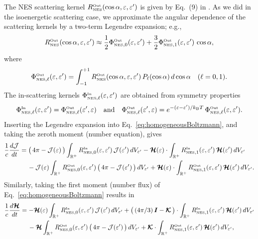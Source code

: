 \documentclass[10pt,preprint]{aastex}
\newcommand{\NES}{\mbox{\tiny NES}}
\begin{document}
The NES scattering kernel $R_{\NES}^{\Out}(\cos\alpha,\epsilonNu,\epsilonNu')$ is given by Eq.~(9) in \citet{mezzacappaBruenn_1993c}.  
As we did in the isoenergetic scattering case, we approximate the angular dependence of the scattering kernels by a two-term Legendre expansion; e.g.,
\begin{equation}
  R^{\Out}_{\NES}(\cos\alpha,\epsilonNu,\epsilonNu') 
  \approx \f{1}{2} \Phi_{\NES,0}^{\Out}(\epsilonNu,\epsilonNu') + \f{3}{2}\Phi^{\Out}_{\NES,1}(\epsilonNu,\epsilonNu')\,\cos\alpha,
\end{equation}
where
\begin{equation}
  \Phi_{\NES,\ell}^{\Out}(\epsilonNu,\epsilonNu')
  =\int_{-1}^{+1}R_{\NES}^{\Out}(\cos\alpha,\epsilonNu,\epsilonNu')\,P_{\ell}(\cos\alpha)\,d\cos\alpha \quad (\ell=0,1).  
\end{equation}
The in-scattering kernels $\Phi_{\NES,\ell}^{\In}(\epsilonNu,\epsilonNu')$ are obtained from symmetry properties \citep{cernohorsky_1994}
\begin{equation}
  \Phi_{\NES,\ell}^{\In}(\epsilonNu,\epsilonNu')=\Phi_{\NES,\ell}^{\Out}(\epsilonNu',\epsilonNu)
  \quad\text{and}\quad
  \Phi_{\NES,\ell}^{\Out}(\epsilonNu',\epsilonNu)
  =e^{-(\epsilonNu-\epsilonNu')/k_{\mbox{\tiny B}}T}\,\Phi_{\NES,\ell}^{\Out}(\epsilonNu,\epsilonNu').
  \label{eq:symmetryNES}
\end{equation}
Inserting the Legendre expansion into Eq.~\eqref{eq:homogeneousBoltzmann}, and taking the zeroth moment (number equation), gives
\begin{align}
  \f{1}{c}\deriv{\cJ}{t}
  &=\big(\,4\pi-\cJ(\epsilonNu)\,\big)\int_{\bbR^{+}}R_{\NES,0}^{\In}(\epsilonNu,\epsilonNu')\,\cJ(\epsilonNu')\,dV_{\epsilonNu'}
  -\bcH(\epsilonNu)\cdot\int_{\bbR^{+}}R_{\NES,1}^{\In}(\epsilonNu,\epsilonNu')\,\bcH(\epsilonNu')\,dV_{\epsilonNu'} \nonumber \\
  & \hspace{12pt}
  -\cJ(\epsilonNu)\int_{\bbR^{+}}R_{\NES,0}^{\Out}(\epsilonNu,\epsilonNu')\,\big(\,4\pi-\cJ(\epsilonNu')\,\big)\,dV_{\epsilonNu'}
  +\bcH(\epsilonNu)\cdot\int_{\bbR^{+}}R_{\NES,1}^{\Out}(\epsilonNu,\epsilonNu')\,\bcH(\epsilonNu')\,dV_{\epsilonNu'}.  
\end{align}
Similarly, taking the first moment (number flux) of Eq.~\eqref{eq:homogeneousBoltzmann} results in
\begin{align}
  \f{1}{c}\deriv{\bcH}{t}
  &=-\bcH(\epsilonNu)\int_{\bbR^{+}}R_{\NES,0}^{\In}(\epsilonNu,\epsilonNu')\,\cJ(\epsilonNu')\,dV_{\epsilonNu'}
  +\big(\,(4\pi/3)\,\bI-\bcK\,\big)\cdot\int_{\bbR^{+}}R_{\NES,1}^{\In}(\epsilonNu,\epsilonNu')\,\bcH(\epsilonNu')\,dV_{\epsilonNu'} \nonumber \\
  & \hspace{12pt}
  -\bcH\int_{\bbR^{+}}R_{\NES,0}^{\Out}(\epsilonNu,\epsilonNu')\,\big(\,4\pi-\cJ(\epsilonNu')\,\big)\,dV_{\epsilonNu'}
  +\bcK\cdot\int_{\bbR^{+}}R_{\NES,1}^{\Out}(\epsilonNu,\epsilonNu')\,\bcH(\epsilonNu')\,dV_{\epsilonNu'},
\end{align}
\end{document}
